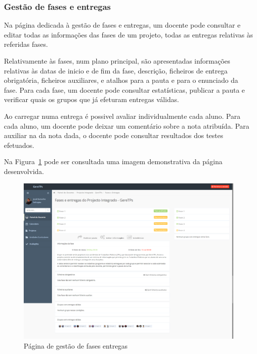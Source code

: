 \subsubsection{Gestão de fases e entregas}
\label{ssub:gestao_fases}

Na página dedicada à gestão de fases e entregas, um docente pode consultar e editar todas as informações das fases de um projeto, todas as entregas relativas às referidas fases.

Relativamente às fases, num plano principal, são apresentadas informações relativas às datas de inicio e de fim da fase, descrição, ficheiros de entrega obrigatória, ficheiros auxiliares, e atalhos para a pauta e para o enunciado da fase. Para cada fase, um docente pode consultar estatísticas, publicar a pauta e verificar quais os grupos que já efeturam entregas válidas.

Ao carregar numa entrega é possivel avaliar individualmente cada aluno. Para cada aluno, um docente pode deixar um comentário sobre a nota atribuída. Para auxiliar na da nota dada, o docente pode consultar resultados dos testes efetuados.

Na Figura~\ref{fig:teacher_deliveries} pode ser consultada uma imagem demonstrativa da página desenvolvida.

\begin{figure}[H]
  \centering
  \includegraphics[width=1\textwidth,center]{images/implementacao/docentes/deliveries}
  \caption{Página de gestão de fases entregas}
  \label{fig:teacher_deliveries}
\end{figure}
